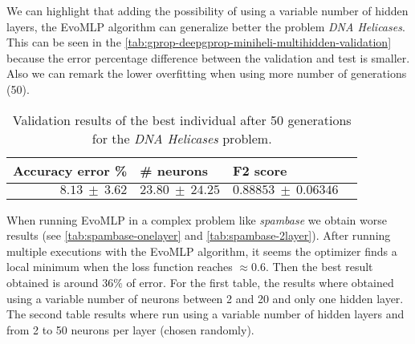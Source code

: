 \documentclass[runningheads]{llncs}
\begin{document}
We can highlight that adding the possibility of using a variable number of
hidden layers, the {\sf EvoMLP} algorithm can generalize better the problem
\emph{DNA Helicases}. This can be seen in the
\autoref{tab:gprop-deepgprop-miniheli-multihidden-validation} because the error
percentage difference between the validation and test is smaller. Also we can
remark the lower overfitting when using more number of generations (50).

\begin{table}
    \centering
    \caption{
        Validation results of the best individual after 50 generations for the
        \emph{DNA Helicases} problem.
    }
    \label{tab:gprop-deepgprop-miniheli-multihidden-validation}
    \begin{tabular}{rlll}
        \textbf{Accuracy error \%} & \textbf{\# neurons} & \textbf{F2 score} \\
        \hline
        $8.13\ \pm\ 3.62$ & $23.80\ \pm\ 24.25$ & $0.88853\ \pm\ 0.06346$ \\
    \end{tabular}
\end{table}


When running {\sf EvoMLP} in a complex problem like \emph{spambase} we obtain
worse results (see \autoref{tab:spambase-onelayer} and
\autoref{tab:spambase-2layer}). After running multiple executions with the
{\sf EvoMLP} algorithm, it seems the optimizer finds a local minimum when the
loss function reaches $\approx0.6$. Then the best result obtained is around
$36\%$ of error. For the first table, the results where obtained using a
variable number of neurons between 2 and 20 and only one hidden layer. The
second table results where run using a variable number of hidden layers and
from 2 to 50 neurons per layer (chosen randomly).
\end{document}
